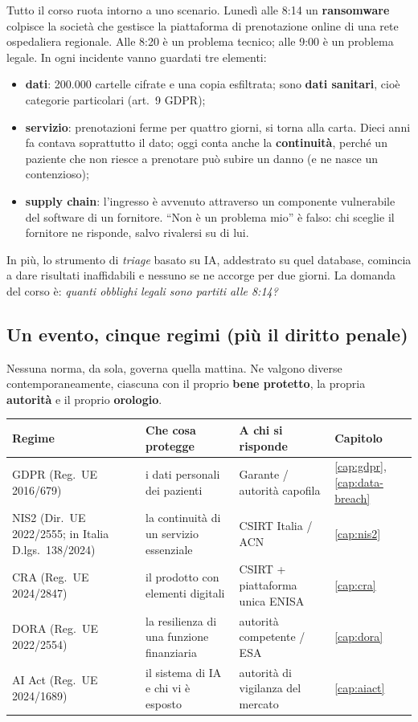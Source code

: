 Tutto il corso ruota intorno a uno scenario. Lunedì alle 8:14 un \textbf{ransomware} colpisce la
società che gestisce la piattaforma di prenotazione online di una rete ospedaliera regionale. Alle 8:20
è un problema tecnico; alle 9:00 è un problema legale. In ogni incidente vanno guardati tre elementi:
\begin{itemize}
  \item \textbf{dati}: 200.000 cartelle cifrate e una copia esfiltrata; sono \textbf{dati sanitari},
    cioè categorie particolari (art.~9 GDPR);
  \item \textbf{servizio}: prenotazioni ferme per quattro giorni, si torna alla carta. Dieci anni fa
    contava soprattutto il dato; oggi conta anche la \textbf{continuità}, perché un paziente che non
    riesce a prenotare può subire un danno (e ne nasce un contenzioso);
  \item \textbf{supply chain}: l'ingresso è avvenuto attraverso un componente vulnerabile del software
    di un fornitore. ``Non è un problema mio'' è falso: chi sceglie il fornitore ne risponde, salvo
    rivalersi su di lui.
\end{itemize}
In più, lo strumento di \emph{triage} basato su IA, addestrato su quel database, comincia a dare
risultati inaffidabili e nessuno se ne accorge per due giorni. La domanda del corso è: \emph{quanti
obblighi legali sono partiti alle 8:14?}

\subsection{Un evento, cinque regimi (più il diritto penale)}
\label{sec:intro-regimi}

Nessuna norma, da sola, governa quella mattina. Ne valgono diverse contemporaneamente, ciascuna con il
proprio \textbf{bene protetto}, la propria \textbf{autorità} e il proprio \textbf{orologio}.

\begin{center}
\small
\begin{tabularx}{\linewidth}{>{\raggedright\arraybackslash}p{3.1cm} X >{\raggedright\arraybackslash}p{3.6cm} >{\raggedright\arraybackslash}p{1.8cm}}
\toprule
\textbf{Regime} & \textbf{Che cosa protegge} & \textbf{A chi si risponde} & \textbf{Capitolo}\\
\midrule
GDPR (Reg.~UE 2016/679) & i dati personali dei pazienti & Garante / autorità capofila &
  \ref{cap:gdpr}, \ref{cap:data-breach}\\
NIS2 (Dir.~UE 2022/2555; in Italia D.lgs.~138/2024) & la continuità di un servizio essenziale &
  CSIRT Italia / ACN & \ref{cap:nis2}\\
CRA (Reg.~UE 2024/2847) & il prodotto con elementi digitali & CSIRT + piattaforma unica ENISA &
  \ref{cap:cra}\\
DORA (Reg.~UE 2022/2554) & la resilienza di una funzione finanziaria & autorità competente / ESA &
  \ref{cap:dora}\\
AI Act (Reg.~UE 2024/1689) & il sistema di IA e chi vi è esposto & autorità di vigilanza del mercato &
  \ref{cap:aiact}\\
\bottomrule
\end{tabularx}
\end{center}

